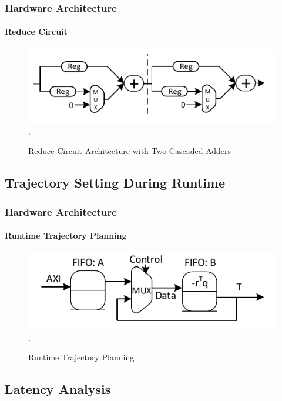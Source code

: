 \documentclass{beamer}
\begin{document}
\begin{frame}
\frametitle{Hardware Architecture}
\framesubtitle{Reduce Circuit}
\begin{figure}[t]
\centering
\captionsetup{justification=centering}
\includegraphics[scale=0.9]{../ASAP_17/figure/Reduce.pdf}
\DeclareGraphicsExtensions.
\caption{Reduce Circuit Architecture with Two Cascaded Adders\label{fig_red}}
\end{figure}



\end{frame}


\subsection{Trajectory Setting During Runtime}
\begin{frame}
\frametitle{Hardware Architecture}
\framesubtitle{Runtime Trajectory Planning}
\begin{figure}[t]
\centering
\captionsetup{justification=centering}
\includegraphics[scale=.75]{../ASAP_17/figure/trajectoryProfile.pdf}
\DeclareGraphicsExtensions.
\caption{Runtime Trajectory Planning\label{fig_traj}}
\end{figure}
\end{frame}


\subsection{Latency Analysis}
\begin{frame}

\end{frame}
\end{document}
